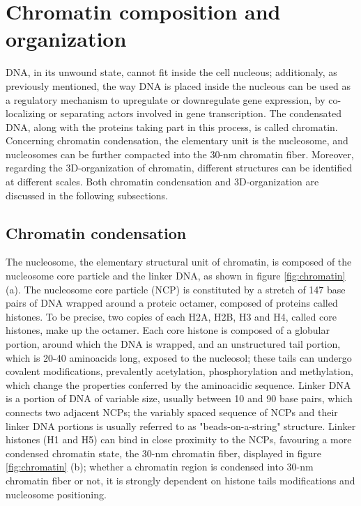 \section{Chromatin composition and organization}

DNA, in its unwound state, cannot fit inside the cell nucleous; additionaly, as previously mentioned, the way DNA is placed inside the nucleous can be used as a regulatory mechanism to upregulate or downregulate gene expression, by co-localizing or separating actors involved in gene transcription. The condensated DNA, along with the proteins taking part in this process, is called chromatin. Concerning chromatin condensation, the elementary unit is the nucleosome\cite{chromatinstructure2018}, and nucleosomes can be further compacted into the 30-nm chromatin fiber\cite{chromatinfiber2015}. Moreover, regarding the 3D-organization of chromatin, different structures can be identified at different scales\cite{chromatinorganization2019}. Both chromatin condensation and 3D-organization are discussed in the following subsections.

\subsection{Chromatin condensation}
The nucleosome, the elementary structural unit of chromatin, is composed of the nucleosome core particle and the linker DNA, as shown in figure \ref{fig:chromatin} (a). The nucleosome core particle (NCP) is constituted by a stretch of 147 base pairs of DNA wrapped around a proteic octamer, composed of proteins called histones. To be precise, two copies of each H2A, H2B, H3 and H4, called core histones, make up the octamer\cite{nucleosomecore1997}. Each core histone is composed of a globular portion, around which the DNA is wrapped, and an unstructured tail portion, which is 20-40 aminoacids long, exposed to the nucleosol; these tails can undergo covalent modifications, prevalently acetylation, phosphorylation and methylation, which change the properties conferred by the aminoacidic sequence\cite{histonemodifications2020}. Linker DNA is a portion of DNA of variable size, usually between 10 and 90 base pairs, which connects two adjacent NCPs; the variably spaced sequence of NCPs and their linker DNA portions is usually referred to as "beads-on-a-string" structure. Linker histones (H1 and H5) can bind in close proximity to the NCPs, favouring a more condensed chromatin state, the 30-nm chromatin fiber, displayed in figure \ref{fig:chromatin} (b); whether a chromatin region is condensed into 30-nm chromatin fiber or not, it is strongly dependent on histone tails modifications and nucleosome positioning\cite{chromatinfiber2015}.

